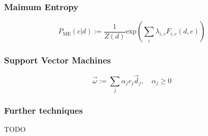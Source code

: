 \subsubsection*{Maimum Entropy}

\begin{equation*}
P_{\mathrm{ME}}(c \vert d) := \frac{1}{Z(d)}\mathrm{exp}\left( \sum_{i} \lambda_{i,c} F_{i,c}(d,c) \right)
\end{equation*}

\subsubsection*{Support Vector Machines}

\begin{equation*}
\vec{\omega} := \sum_j \alpha_j c_j \vec{d}_j,\quad \alpha_j \geq 0
\end{equation*}

\subsubsection*{Further techniques}

TODO